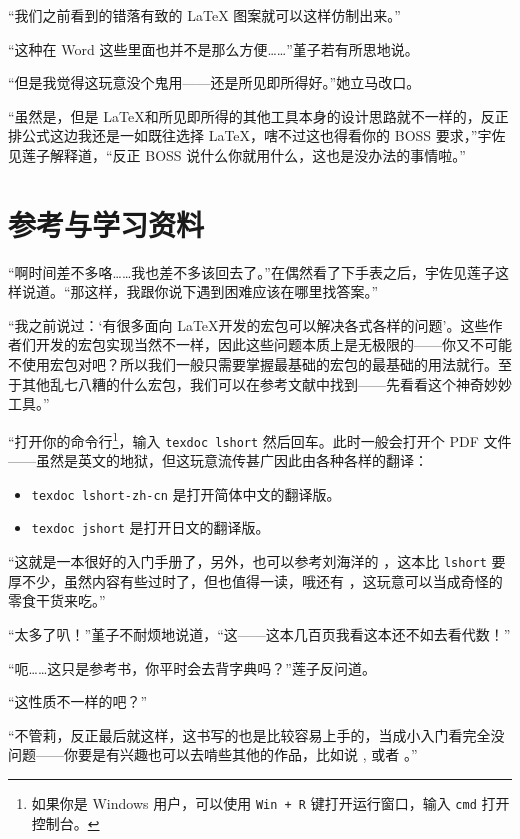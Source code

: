 {“我们之前看到的错落有致的 \LaTeX{} 图案就可以这样仿制出来。”

“这种在 Word 这些里面也并不是那么方便……”堇子若有所思地说。

“但是我觉得这玩意没个鬼用——还是所见即所得好。”她立马改口。

“虽然是，但是 \LaTeX 和所见即所得的其他工具本身的设计思路就不一样的，反正排公式这边我还是一如既往选择 \LaTeX，嗐不过这也得看你的 BOSS 要求，”宇佐见莲子解释道，“反正 BOSS 说什么你就用什么，这也是没办法的事情啦。”

\section{参考与学习资料}

“啊时间差不多咯……我也差不多该回去了。”在偶然看了下手表之后，宇佐见莲子这样说道。“那这样，我跟你说下遇到困难应该在哪里找答案。”

“我之前说过：‘有很多面向 \LaTeX 开发的宏包可以解决各式各样的问题’。这些作者们开发的宏包实现当然不一样，因此这些问题本质上是无极限的——你又不可能不使用宏包对吧？所以我们一般只需要掌握最基础的宏包的最基础的用法就行。至于其他乱七八糟的什么宏包，我们可以在参考文献中找到——先看看这个神奇妙妙工具。”

“打开你的命令行\footnote{如果你是 Windows 用户，可以使用 \texttt{Win + R} 键打开运行窗口，输入 \texttt{cmd} 打开控制台。}，输入 \verb"texdoc lshort" 然后回车。此时一般会打开个 PDF 文件 \citep[LShort]{oetiker2003not}
——虽然是英文的地狱，但这玩意流传甚广因此由各种各样的翻译：

\begin{itemize}
    \item  \verb"texdoc lshort-zh-cn" 是打开简体中文的翻译版。
    \item  \verb"texdoc jshort" 是打开日文的翻译版。
\end{itemize}

“这就是一本很好的入门手册了，另外，也可以参考刘海洋的 \citep[\LaTeX 入门]{刘海洋2013latex}，这本比 \verb"lshort" 要厚不少，虽然内容有些过时了，但也值得一读，哦还有 \citep[\LaTeX{} Reference Sheet for a thesis with KOMA-Script]{RSTL23KS}，这玩意可以当成奇怪的零食干货来吃。”

“太多了叭！”堇子不耐烦地说道，“这——这本几百页我看这本还不如去看代数！”

“呃……这只是参考书，你平时会去背字典吗？”莲子反问道。

“这性质不一样的吧？”

“不管莉，反正最后就这样，这书写的也是比较容易上手的，当成小入门看完全没问题——你要是有兴趣也可以去啃些其他的作品，比如说 \citep[The \LaTeX{} Companion. Second Edition]{mittelbach2004latex}, 或者 \citep[The \TeX book]{knuth1984texbook}。”

}
